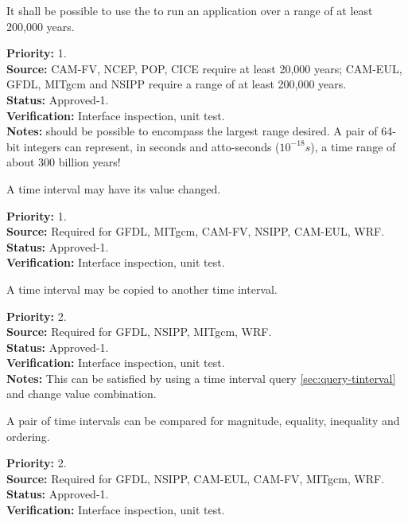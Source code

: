 It shall be possible to use the \funcname to run an application over a range of at 
least 200,000 years.  
\begin{reqlist}
{\bf Priority:} 1. \\
{\bf Source:} CAM-FV, NCEP, POP, CICE require at least 20,000 years; 
CAM-EUL, GFDL, MITgcm and NSIPP require a range of at least 200,000 years. \\
{\bf Status:} Approved-1. \\
{\bf Verification:} Interface inspection, unit test. \\
{\bf Notes:} should be possible to encompass the largest range desired.  
A pair of 64-bit integers can represent, in seconds and atto-seconds ($10^{-18}s$), 
a time range of about 300 billion years!
\end{reqlist}


A time interval may have its value changed.
\begin{reqlist}
{\bf Priority:} 1. \\
{\bf Source:} Required for GFDL, MITgcm, CAM-FV, NSIPP, CAM-EUL, WRF.\\
{\bf Status:} Approved-1. \\
{\bf Verification:} Interface inspection, unit test. 
\end{reqlist}

A time interval may be copied to another time interval. 
\begin{reqlist}
{\bf Priority:} 2. \\
{\bf Source:} Required for GFDL, NSIPP, MITgcm, WRF. \\
{\bf Status:} Approved-1. \\
{\bf Verification:} Interface inspection, unit test. \\ 
{\bf Notes:}  This can be satisfied by using a time interval 
query \ref{sec:query-tinterval} and change value combination.
\end{reqlist}

A pair of time intervals can be compared for magnitude, equality, inequality
 and ordering.
\begin{reqlist}
{\bf Priority:} 2. \\
{\bf Source:} Required for GFDL, NSIPP, CAM-EUL, CAM-FV, MITgcm, WRF.\\
{\bf Status:} Approved-1. \\
{\bf Verification:} Interface inspection, unit test. 
\end{reqlist}

